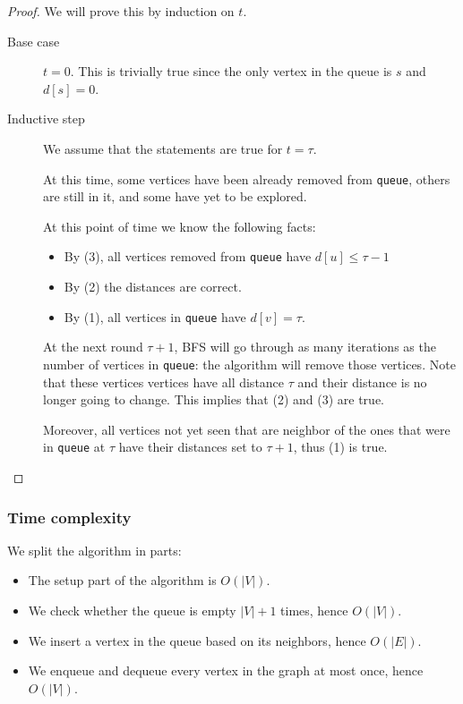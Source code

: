 \documentclass[10pt]{extarticle}
\begin{document}
\begin{proof}
    We will prove this by induction on $t$.

    \begin{description}
        \item[Base case] $t = 0$.
            This is trivially true since the only vertex in the queue is $s$ and $d[s] = 0$.

        \item[Inductive step] We assume that the statements are true for $t = \tau$.

            At this time, some vertices have been already removed from \texttt{queue}, others are still in it, and some have yet to be explored.

            At this point of time we know the following facts:
            \begin{itemize}
                \item By (3), all vertices removed from \texttt{queue} have $d[u] \leq \tau - 1$
                \item By (2) the distances are correct.
                \item By (1), all vertices in \texttt{queue} have $d[v] = \tau$.
            \end{itemize}

            At the next round $\tau + 1$, BFS will go through as many iterations as the number of vertices in \texttt{queue}: the algorithm will remove those vertices.
            Note that these vertices vertices have all distance $\tau$ and their distance is no longer going to change. This implies that (2) and (3) are true.

            Moreover, all vertices not yet seen that are neighbor of the ones that were in \texttt{queue} at $\tau$ have their distances set to $\tau + 1$, thus (1) is true.
    \end{description}
\end{proof}

\subsubsection{Time complexity}

We split the algorithm in parts:

\begin{itemize}
    \item The setup part of the algorithm is $O(|V|)$.
    \item We check whether the queue is empty $|V| + 1$ times, hence $O(|V|)$.
    \item We insert a vertex in the queue based on its neighbors, hence $O(|E|)$.
    \item We enqueue and dequeue every vertex in the graph at most once, hence $O(|V|)$.
\end{itemize}
\end{document}
